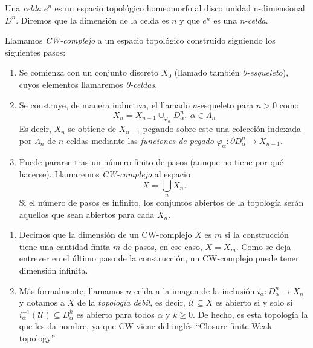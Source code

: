\bigskip

\begin{definition}
    Una \textit{celda} $e^n$ es un espacio topológico homeomorfo al disco unidad n-dimensional $D^n$. Diremos que la dimensión de la celda es $n$ y que $e^n$ es una \textit{n-celda}.
\end{definition}

\bigskip

\begin{definition}
    Llamamos \textit{CW-complejo} a un espacio topológico construido siguiendo los siguientes pasos:

        \begin{enumerate}[label=(\roman*)]
            \item Se comienza con un conjunto discreto $ X_0 $ (llamado también \textit{0-esqueleto}), cuyos elementos llamaremos \textit{0-celdas}.
            
            \item Se construye, de manera inductiva, el llamado $ n $-esqueleto para $n>0$ como
            \begin{equation*}
                X_n = X_{n-1}\cup_{\varphi_{\alpha}}D^n_{\alpha},~\alpha\in \Lambda_n
            \end{equation*}
            Es decir, $X_n$ se obtiene de $X_{n-1}$ pegando sobre este una colección indexada por $\Lambda_n$ de $n$-celdas mediante las \textit{funciones de pegado} $\varphi_{\alpha} : \partial D^n_{\alpha} \to X_{n-1}$.
            
            \item Puede pararse tras un número finito de pasos (aunque no tiene por qué hacerse). Llamaremos \textit{CW-complejo} al espacio 
            \begin{equation*}
                X = \bigcup_{n} X_n.    
            \end{equation*}
            Si el número de pasos es infinito, los conjuntos abiertos de la topología serán aquellos que sean abiertos para cada $ X_n $.
        \end{enumerate} 
\end{definition}

\bigskip

\begin{remark} \hfill
    \begin{enumerate}
        \item Decimos que la dimensión de un CW-complejo $X$ es $m$ si la construcción tiene una cantidad finita $m$ de pasos, en ese caso, $X=X_m$. Como se deja entrever en el último paso de la construcción, un CW-complejo puede tener dimensión infinita.
        \item Más formalmente, llamamos $n$-celda a la imagen de la inclusión $i_{\alpha}: D^n_{\alpha}\to X_n$ y dotamos a $X$ de la \textit{topología débil}, es decir, $\mathcal{U}\subseteq X$ es abierto si y solo si $i^{-1}_{\alpha}(\mathcal{U})\subseteq D^k_{\alpha}$ es abierto para todos $\alpha$ y $k\ge 0$. De hecho, es esta topología la que les da nombre, ya que CW viene del inglés ``Closure finite-Weak topology''
    \end{enumerate}
\end{remark}

